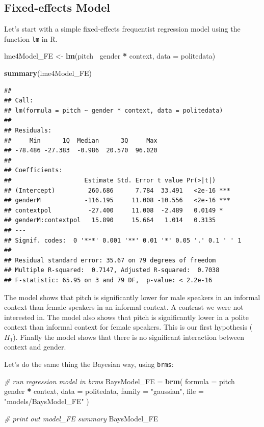 \documentclass[]{book}
\newenvironment{Shaded}{\begin{snugshade}}{\end{snugshade}}
\newcommand{\CommentTok}[1]{\textcolor[rgb]{0.56,0.35,0.01}{\textit{#1}}}
\newcommand{\DataTypeTok}[1]{\textcolor[rgb]{0.13,0.29,0.53}{#1}}
\newcommand{\KeywordTok}[1]{\textcolor[rgb]{0.13,0.29,0.53}{\textbf{#1}}}
\newcommand{\NormalTok}[1]{#1}
\newcommand{\OperatorTok}[1]{\textcolor[rgb]{0.81,0.36,0.00}{\textbf{#1}}}
\newcommand{\StringTok}[1]{\textcolor[rgb]{0.31,0.60,0.02}{#1}}
\begin{document}
\hypertarget{fixed-effects-model}{%
\subsection{Fixed-effects Model}\label{fixed-effects-model}}

Let's start with a simple fixed-effects frequentist regression model using the function \texttt{lm} in R.

\begin{Shaded}
\begin{Highlighting}[]
\NormalTok{lme4Model_FE <-}\StringTok{ }\KeywordTok{lm}\NormalTok{(pitch}\OperatorTok{~}\StringTok{ }\NormalTok{gender }\OperatorTok{*}\StringTok{ }\NormalTok{context, }\DataTypeTok{data =}\NormalTok{ politedata)}

\KeywordTok{summary}\NormalTok{(lme4Model_FE)}
\end{Highlighting}
\end{Shaded}

\begin{verbatim}
## 
## Call:
## lm(formula = pitch ~ gender * context, data = politedata)
## 
## Residuals:
##     Min      1Q  Median      3Q     Max 
## -78.486 -27.383  -0.986  20.570  96.020 
## 
## Coefficients:
##                    Estimate Std. Error t value Pr(>|t|)    
## (Intercept)         260.686      7.784  33.491   <2e-16 ***
## genderM            -116.195     11.008 -10.556   <2e-16 ***
## contextpol          -27.400     11.008  -2.489   0.0149 *  
## genderM:contextpol   15.890     15.664   1.014   0.3135    
## ---
## Signif. codes:  0 '***' 0.001 '**' 0.01 '*' 0.05 '.' 0.1 ' ' 1
## 
## Residual standard error: 35.67 on 79 degrees of freedom
## Multiple R-squared:  0.7147, Adjusted R-squared:  0.7038 
## F-statistic: 65.95 on 3 and 79 DF,  p-value: < 2.2e-16
\end{verbatim}

The model shows that pitch is significantly lower for male speakers in an informal context than female speakers in an informal context. A contrast we were not interested in. The model also shows that pitch is significantly lower in a polite context than informal context for female speakers. This is our first hypothesis (\(H_1\)). Finally the model shows that there is no significant interaction between context and gender.

Let's do the same thing the Bayesian way, using \texttt{brms}:

\begin{Shaded}
\begin{Highlighting}[]
\CommentTok{# run regression model in brms}
\NormalTok{BaysModel_FE =}\StringTok{ }\KeywordTok{brm}\NormalTok{(}
  \DataTypeTok{formula =}\NormalTok{ pitch }\OperatorTok{~}\StringTok{ }\NormalTok{gender }\OperatorTok{*}\StringTok{ }\NormalTok{context,}
  \DataTypeTok{data =}\NormalTok{ politedata,}
  \DataTypeTok{family =} \StringTok{"gaussian"}\NormalTok{,}
  \DataTypeTok{file =} \StringTok{"models/BaysModel_FE"}
\NormalTok{)}

\CommentTok{# print out model_FE summary}
\NormalTok{BaysModel_FE}
\end{Highlighting}
\end{Shaded}
\end{document}
